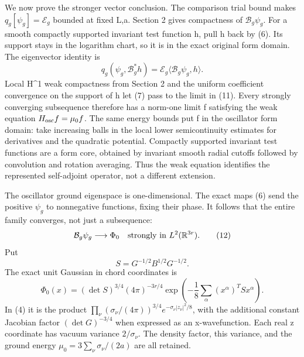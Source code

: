\documentclass[
  11pt,
]{article}
\begin{document}
We now prove the stronger vector conclusion. The comparison trial bound
makes \(q_g[\psi_g]=\mathcal E_g\) bounded at fixed L,a. Section 2 gives
compactness of \(\mathcal B_g\psi_g\). For a smooth compactly supported
invariant test function h, pull h back by (6). Its support stays in the
logarithm chart, so it is in the exact original form domain. The
eigenvector identity is \[
 q_g(\psi_g,\mathcal B_g^*h)
       =\mathcal E_g\langle\mathcal B_g\psi_g,h\rangle.
                                                               \tag{11}
\] Local H\^{}1 weak compactness from Section 2 and the uniform
coefficient convergence on the support of h let (7) pass to the limit in
(11). Every strongly converging subsequence therefore has a norm-one
limit f satisfying the weak equation \(H_{\rm osc}f=\mu_0f\). The same
energy bounds put f in the oscillator form domain: take increasing balls
in the local lower semicontinuity estimates for derivatives and the
quadratic potential. Compactly supported invariant test functions are a
form core, obtained by invariant smooth radial cutoffs followed by
convolution and rotation averaging. Thus the weak equation identifies
the represented self-adjoint operator, not a different extension.

The oscillator ground eigenspace is one-dimensional. The exact maps (6)
send the positive \(\psi_g\) to nonnegative functions, fixing their
phase. It follows that the entire family converges, not just a
subsequence: \[
 \mathcal B_g\psi_g\longrightarrow\Phi_0
           \quad\hbox{strongly in }L^2(\mathbb R^{3r}).      \tag{12}
\] Put \[
 S=G^{-1/2}B^{1/2}G^{-1/2}.
\] The exact unit Gaussian in chord coordinates is \[
 \Phi_0(x)=(\det S)^{3/4}(4\pi)^{-3r/4}
       \exp\left(-\frac18\sum_\alpha (x^\alpha)^TSx^\alpha\right).
                                                               \tag{13}
\] In (4) it is the product \(\prod_\nu(\sigma_\nu/(4\pi))^{3/4}
e^{-\sigma_\nu|z_\nu|^2/8}\), with the additional constant Jacobian
factor \((\det G)^{-3/4}\) when expressed as an x-wavefunction. Each
real z coordinate has vacuum variance \(2/\sigma_\nu\). The density
factor, this variance, and the ground energy
\(\mu_0=3\sum_\nu\sigma_\nu/(2a)\) are all retained.
\end{document}
